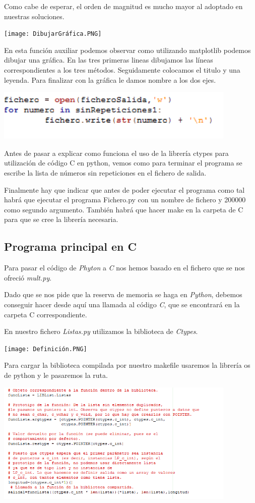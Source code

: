 \documentclass{article}
\begin{document}
Como cabe de esperar, el orden de magnitud es mucho mayor al adoptado en nuestras soluciones.

\texttt{[image: DibujarGráfica.PNG]}

En esta función auxiliar podemos observar como utilizando matplotlib podemos dibujar una gráfica. En las tres primeras lineas dibujamos las líneas correspondientes a los tres métodos. Seguidamente colocamos el titulo y una leyenda. Para finalizar con la gráfica le damos nombre a los dos ejes.

\includegraphics[width=11.5cm]{EscrituraFichero.PNG}

Antes de pasar a explicar como funciona el uso de la librería ctypes para utilización de código C en python, vemos como para terminar el programa se escribe la lista de números sin repeticiones en el fichero de salida.

Finalmente hay que indicar que antes de poder ejecutar el programa como tal habrá que ejecutar el programa Fichero.py con un nombre de fichero y 200000 como segundo argumento. También habrá que hacer make en la carpeta de C para que se cree la librería necesaria.

\subsection{Programa principal en C}
Para pasar el código de \textit{Phyton} a \textit{C} nos hemos basado en el fichero que se nos ofreció \textit{mult.py}.

Dado que se nos pide que la reserva de memoria se haga en \textit{Python}, debemos conseguir hacer desde aquí una llamada al código \textit{C}, que se encontrará en la carpeta C correspondiente.

En nuestro fichero \textit{Listas.py} utilizamos la biblioteca de \textit{Ctypes}.

\texttt{[image: Definición.PNG]}

Para cargar la biblioteca compilada por nuestro makefile usaremos la librería os de python y le pasaremos la ruta.

\includegraphics[width=11.5cm]{ctypes1.PNG}
\end{document}
